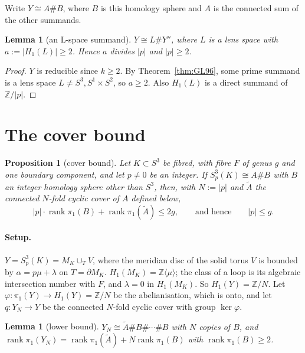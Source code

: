 \documentclass[11pt]{article}
\newtheorem{proposition}[theorem]{Proposition}
\newtheorem{lemma}[theorem]{Lemma}
\theoremstyle{definition}
\newcommand{\Z}{\mathbb{Z}}
\newcommand{\rk}{\operatorname{rank}}
\begin{document}
Write $Y\cong A\#B$, where $B$ is this homology sphere and $A$ is the connected sum of the other summands.

\begin{lemma}[an L-space summand]\label{lem:lens}
$Y\cong L\#Y''$, where $L$ is a lens space with $a:=|H_1(L)|\ge2$. Hence $a$ divides $|p|$ and $|p|\ge2$.
\end{lemma}

\begin{proof}
$Y$ is reducible since $k\ge 2$. By Theorem~\ref{thm:GL96}, some prime summand is a lens space $L\ne S^3,S^1\times S^2$, so $a\ge2$. Also $H_1(L)$ is a direct summand of $\Z/|p|$.
\end{proof}

\section{The cover bound}\label{sec:cover}

\begin{proposition}[cover bound]\label{prop:cover}
Let $K\subset S^3$ be fibred, with fibre $F$ of genus $g$ and one boundary component, and let $p\ne0$ be an integer. If $S^3_p(K)\cong A\#B$ with $B$ an integer homology sphere other than $S^3$, then, with $N:=|p|$ and $\tilde A$ the connected $N$-fold cyclic cover of $A$ defined below,
\[
|p|\cdot\rk\pi_1(B)+\rk\pi_1(\tilde A)\le 2g,\qquad\text{and hence}\qquad |p|\le g.
\]
\end{proposition}

\paragraph{Setup.} $Y=S^3_p(K)=M_K\cup_T V$, where the meridian disc of the solid torus $V$ is bounded by $\alpha=p\mu+\lambda$ on $T=\partial M_K$. $H_1(M_K)=\Z\langle\mu\rangle$; the class of a loop is its algebraic intersection number with $F$, and $\lambda=0$ in $H_1(M_K)$. So $H_1(Y)=\Z/N$. Let $\varphi\colon\pi_1(Y)\to H_1(Y)=\Z/N$ be the abelianisation, which is onto, and let $q\colon Y_N\to Y$ be the connected $N$-fold cyclic cover with group $\ker\varphi$.

\begin{lemma}[lower bound]\label{lem:lower}
$Y_N\cong\tilde A\#B\#\cdots\#B$ with $N$ copies of $B$, and $\rk\pi_1(Y_N)=\rk\pi_1(\tilde A)+N\rk\pi_1(B)$ with $\rk\pi_1(B)\ge2$.
\end{lemma}
\end{document}
